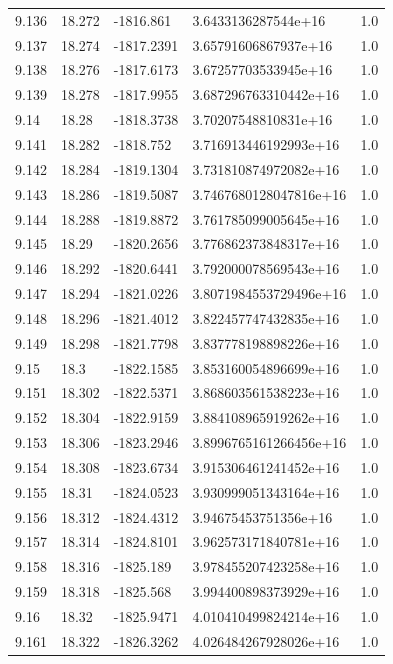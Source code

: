 \begin{tabular}{lllll}
9.136 & 18.272 & -1816.861 & 3.6433136287544e+16 & 1.0 \\
9.137 & 18.274 & -1817.2391 & 3.65791606867937e+16 & 1.0 \\
9.138 & 18.276 & -1817.6173 & 3.67257703533945e+16 & 1.0 \\
9.139 & 18.278 & -1817.9955 & 3.687296763310442e+16 & 1.0 \\
9.14 & 18.28 & -1818.3738 & 3.70207548810831e+16 & 1.0 \\
9.141 & 18.282 & -1818.752 & 3.716913446192993e+16 & 1.0 \\
9.142 & 18.284 & -1819.1304 & 3.731810874972082e+16 & 1.0 \\
9.143 & 18.286 & -1819.5087 & 3.7467680128047816e+16 & 1.0 \\
9.144 & 18.288 & -1819.8872 & 3.761785099005645e+16 & 1.0 \\
9.145 & 18.29 & -1820.2656 & 3.776862373848317e+16 & 1.0 \\
9.146 & 18.292 & -1820.6441 & 3.792000078569543e+16 & 1.0 \\
9.147 & 18.294 & -1821.0226 & 3.8071984553729496e+16 & 1.0 \\
9.148 & 18.296 & -1821.4012 & 3.822457747432835e+16 & 1.0 \\
9.149 & 18.298 & -1821.7798 & 3.837778198898226e+16 & 1.0 \\
9.15 & 18.3 & -1822.1585 & 3.853160054896699e+16 & 1.0 \\
9.151 & 18.302 & -1822.5371 & 3.868603561538223e+16 & 1.0 \\
9.152 & 18.304 & -1822.9159 & 3.884108965919262e+16 & 1.0 \\
9.153 & 18.306 & -1823.2946 & 3.8996765161266456e+16 & 1.0 \\
9.154 & 18.308 & -1823.6734 & 3.915306461241452e+16 & 1.0 \\
9.155 & 18.31 & -1824.0523 & 3.930999051343164e+16 & 1.0 \\
9.156 & 18.312 & -1824.4312 & 3.94675453751356e+16 & 1.0 \\
9.157 & 18.314 & -1824.8101 & 3.962573171840781e+16 & 1.0 \\
9.158 & 18.316 & -1825.189 & 3.978455207423258e+16 & 1.0 \\
9.159 & 18.318 & -1825.568 & 3.994400898373929e+16 & 1.0 \\
9.16 & 18.32 & -1825.9471 & 4.010410499824214e+16 & 1.0 \\
9.161 & 18.322 & -1826.3262 & 4.026484267928026e+16 & 1.0 \\

\end{tabular}
